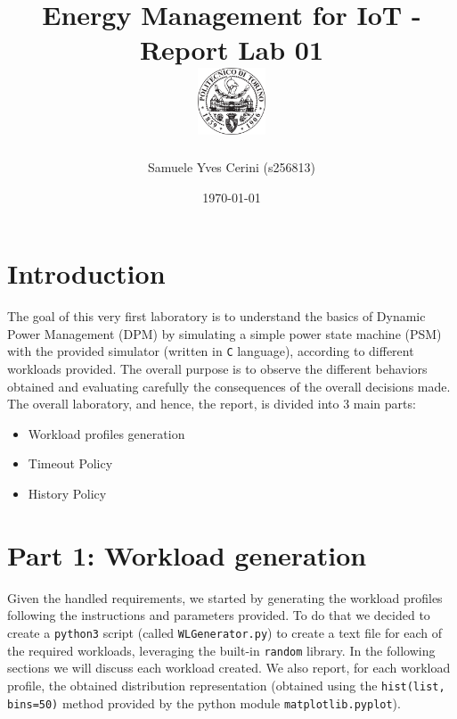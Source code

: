 \documentclass[a4paper]{article}
\begin{document}
    \title{
        Energy Management for IoT - Report Lab 01 \\[0.5cm]
        \includegraphics[width=0.15\textwidth]{PoliLogo.png}%
    }
    \author{Samuele Yves Cerini (s256813)}
    \date{\today}
    \maketitle

    \tableofcontents

%
\section{Introduction}
    The goal of this very first laboratory is to understand the basics of Dynamic Power Management (DPM) by simulating a simple power state machine (PSM) with the provided simulator (written in \texttt{C} language), according to different workloads provided. The overall purpose is to observe the different behaviors obtained and evaluating carefully the consequences of the overall decisions made. The overall laboratory, and hence, the report, is divided into 3 main parts:
    \begin{itemize}
        \item Workload profiles generation
        \item Timeout Policy
        \item History Policy
    \end{itemize}

%
\section{Part 1: Workload generation}
    Given the handled requirements, we started by generating the workload profiles following the instructions and parameters provided. To do that we decided to create a \texttt{python3} script (called \texttt{WLGenerator.py}) to create a text file for each of the required workloads, leveraging the built-in \texttt{random} library. In the following sections we will discuss each workload created. We also report, for each workload profile, the obtained distribution representation (obtained using the \texttt{hist(list, bins=50)} method provided by the python module \texttt{matplotlib.pyplot}).
\end{document}
